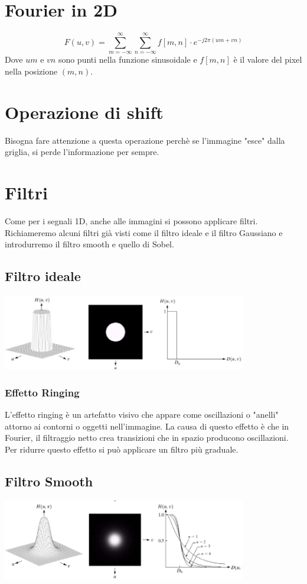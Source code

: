 \documentclass[12pt, a4paper]{report}
\begin{document}
\section{Fourier in 2D}
\begin{equation*}
    F(u,v) = \sum_{m=-\infty}^{\infty}\sum_{n=-\infty}^{\infty} f[m,n]\cdot e^{-j2\pi(um+vn)}
\end{equation*}
Dove $um$ e $vn$ sono punti nella funzione sinusoidale e $f[m,n]$ è il valore del pixel nella posizione $(m,n)$.
\section{Operazione di shift}
Bisogna fare attenzione a questa operazione perchè se l'immagine "esce" dalla griglia, si perde l'informazione per sempre.
\section{Filtri}
Come per i segnali 1D, anche alle immagini si possono applicare filtri. Richiameremo alcuni filtri già visti come il filtro ideale e il filtro Gaussiano e introdurremo il filtro smooth e quello di Sobel.
\subsection{Filtro ideale}
\begin{center}
    \includegraphics[width=0.8\textwidth]{Immagini/filtro2dideale.png}
\end{center}
\subsubsection{Effetto Ringing}
L'effetto ringing è un artefatto visivo che appare come oscillazioni o "anelli" attorno ai contorni o oggetti nell'immagine. La causa di questo effetto è che in Fourier, il filtraggio netto crea transizioni che in spazio producono oscillazioni. Per ridurre questo effetto si può applicare un filtro più graduale.
\subsection{Filtro Smooth}
\begin{center}
    \includegraphics[width=0.8\textwidth]{Immagini/filtro2dsmooth.png}
\end{center}
\end{document}
